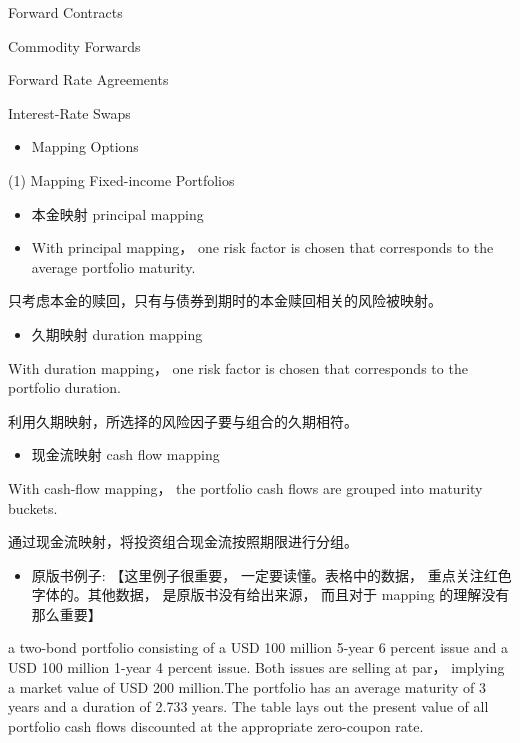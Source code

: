      Forward Contracts
    
     Commodity Forwards
    
    Forward Rate Agreements

     Interest-Rate Swaps
    
    \begin{itemize}
    \item Mapping Options
    \end{itemize}
    
    (1) Mapping Fixed-income Portfolios
    
    \begin{itemize}
    \item 本金映射 principal mapping
    \end{itemize}
    
    \begin{itemize}
    \item With principal mapping， one risk factor is chosen that corresponds to the average portfolio maturity.
    \end{itemize}
    
     只考虑本金的赎回，只有与债券到期时的本金赎回相关的风险被映射。
    
    \begin{itemize}
    \item 久期映射 duration mapping
    \end{itemize}
    
     With duration mapping， one risk factor is chosen that corresponds to the portfolio duration.
    
     利用久期映射，所选择的风险因子要与组合的久期相符。
    
    \begin{itemize}
    \item 现金流映射 cash flow mapping
    \end{itemize}
    
    With cash-flow mapping， the portfolio cash flows are grouped into maturity buckets.
    
     通过现金流映射，将投资组合现金流按照期限进行分组。
    
    \begin{itemize}
    \item 原版书例子: 【这里例子很重要， 一定要读懂。表格中的数据， 重点关注红色字体的。其他数据， 是原版书没有给出来源， 而且对于 mapping 的理解没有那么重要】
    \end{itemize}
    
    a two-bond portfolio consisting of a USD 100 million 5-year 6 percent issue and a USD 100 million 1-year 4 percent issue. Both issues are selling at par， implying a market value of USD 200 million.The portfolio has an average maturity of 3 years and a duration of 2.733 years. The table lays out the present value of all portfolio cash flows discounted at the appropriate zero-coupon rate.
    
